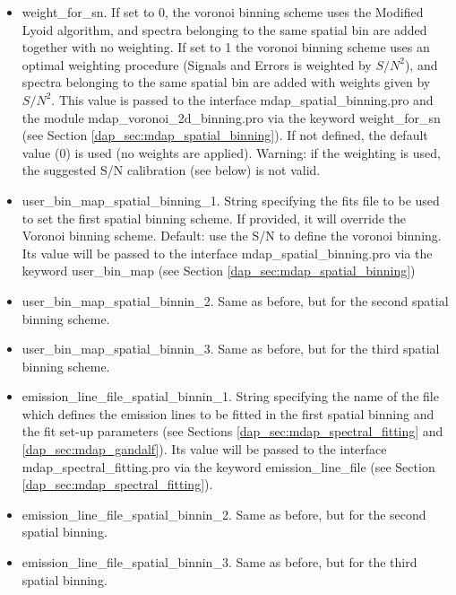 \begin{itemize}
 \item weight\_for\_sn. If set to 0, the voronoi binning scheme uses
   the Modified Lyoid algorithm, and spectra belonging to the same
   spatial bin are added together with no weighting. If set to 1 the
   voronoi binning scheme uses an optimal weighting procedure (Signals
   and Errors is weighted by $S/N^2$), and spectra belonging to the
   same spatial bin are added with weights given by $S/N^2$. This
   value is passed to the interface mdap\_spatial\_binning.pro and the
   module mdap\_voronoi\_2d\_binning.pro via the keyword
   weight\_for\_sn (see Section
   \ref{dap_sec:mdap_spatial_binning}). If not defined, the default
   value (0) is used (no weights are applied). Warning: if the
   weighting is used, the suggested S/N calibration (see below) is not
   valid.

 \item user\_bin\_map\_spatial\_binning\_1. String specifying the fits
   file to be used to set the first spatial binning scheme. If
   provided, it will override the Voronoi binning scheme. Default: use
   the S/N to define the voronoi binning. Its value will be passed to
   the interface mdap\_spatial\_binning.pro via the keyword
   user\_bin\_map (see Section \ref{dap_sec:mdap_spatial_binning})

 \item user\_bin\_map\_spatial\_binnin\_2. Same as before, but for the
   second spatial binning scheme.

 \item user\_bin\_map\_spatial\_binnin\_3. Same as before, but for the
   third spatial binning scheme.

 \item emission\_line\_file\_spatial\_binnin\_1. String specifying the
   name of the file which defines the emission lines to be fitted in
   the first spatial binning and the fit set-up parameters (see
   Sections \ref{dap_sec:mdap_spectral_fitting} and
   \ref{dap_sec:mdap_gandalf}). Its value will be passed to the
   interface mdap\_spectral\_fitting.pro via the keyword
   emission\_line\_file (see Section
   \ref{dap_sec:mdap_spectral_fitting}).

 \item emission\_line\_file\_spatial\_binnin\_2. Same as before, but
   for the second spatial binning.

 \item emission\_line\_file\_spatial\_binnin\_3. Same as before, but
   for the third spatial binning.
    

\end{itemize}
